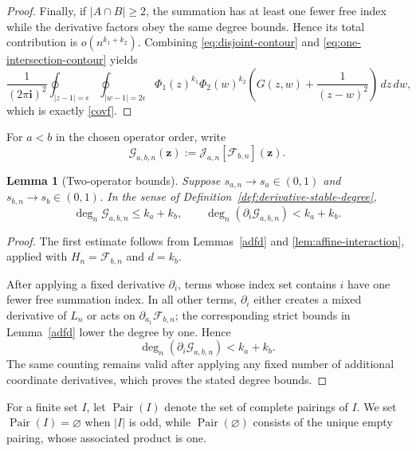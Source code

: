 \documentclass[11pt]{amsart}
\theoremstyle{plain}
\newtheorem{lemma}[theorem]{Lemma}
\numberwithin{equation}{section}
\numberwithin{theorem}{section}
\numberwithin{figure}{section}
\begin{document}
\begin{proof}
Finally, if $|A\cap B|\ge2$, the summation has at least one fewer free
index while the derivative factors obey the same degree bounds.
Hence its total contribution is $o(n^{k_1+k_2})$.  Combining
\eqref{eq:disjoint-contour} and
\eqref{eq:one-intersection-contour} yields
\[
\frac1{(2\pi\mathbf i)^2}
\oint_{|z-1|=\epsilon}\oint_{|w-1|=2\epsilon}
\Phi_1(z)^{k_1}\Phi_2(w)^{k_2}
\left(G(z,w)+\frac1{(z-w)^2}\right)
\,dz\,dw,
\]
which is exactly \eqref{covf}.  
\endgroup
\end{proof}

\begingroup

For \(a<b\) in the chosen operator order, write
\begin{equation}
    \mathcal G_{a,b,n}(\mathbf z)
    :=
    \mathscr J_{a,n}[\mathcal F_{b,n}](\mathbf z).
    \label{eq:affine-pair-function}
\end{equation}


\begin{lemma}[Two-operator bounds]\label{lem:affine-pair-bounds}
Suppose \(s_{a,n}\to s_a\in(0,1)\) and
\(s_{b,n}\to s_b\in(0,1)\). In the sense of
Definition~\ref{def:derivative-stable-degree},
\[
    \deg_n\mathcal G_{a,b,n}\leq k_a+k_b,
    \qquad
    \deg_n(\partial_i\mathcal G_{a,b,n})<k_a+k_b.
\]
\end{lemma}

\begin{proof}
The first estimate follows from Lemmas~\ref{adfd} and
\ref{lem:affine-interaction}, applied with
\(H_n=\mathcal F_{b,n}\) and \(d=k_b\).

After applying a fixed derivative \(\partial_i\), terms whose index set
contains \(i\) have one fewer free summation index. In all other terms,
\(\partial_i\) either creates a mixed derivative of \(L_n\) or acts on
\(\partial_{a_1}\mathcal F_{b,n}\); the corresponding strict bounds in
Lemma~\ref{adfd} lower the degree by one. Hence
\[
    \deg_n(\partial_i\mathcal G_{a,b,n})<k_a+k_b.
\]
The same counting remains valid after applying any fixed number of
additional coordinate derivatives, which proves the stated degree
bounds.
\end{proof}

For a finite set $I$, let $\operatorname{Pair}(I)$ denote the set of
complete pairings of $I$.  We set $\operatorname{Pair}(I)=\varnothing$
when $|I|$ is odd, while $\operatorname{Pair}(\varnothing)$ consists of
the unique empty pairing, whose associated product is one.
\end{document}
